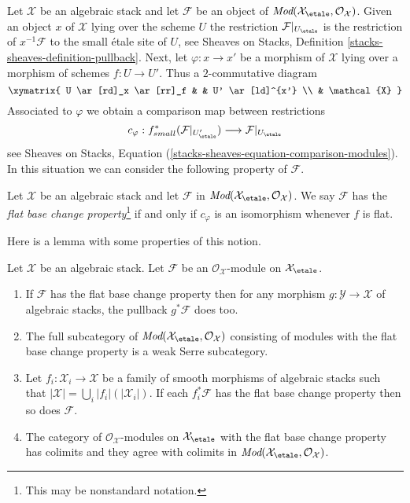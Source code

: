 \noindent
Let $\mathcal{X}$ be an algebraic stack and let $\mathcal{F}$ be an object
of $\textit{Mod}(\mathcal{X}_\etale, \mathcal{O}_\mathcal{X})$.
Given an object $x$ of $\mathcal{X}$ lying over the scheme $U$ the
restriction $\mathcal{F}|_{U_\etale}$ is the restriction of
$x^{-1}\mathcal{F}$ to the small \'etale site of $U$, see
Sheaves on Stacks, Definition \ref{stacks-sheaves-definition-pullback}.
Next, let $\varphi : x \to x'$ be a morphism of $\mathcal{X}$ lying
over a morphism of schemes $f : U \to U'$. Thus a $2$-commutative diagram
$$
\xymatrix{
U \ar[rd]_x \ar[rr]_f & & U' \ar[ld]^{x'} \\
& \mathcal{X}
}
$$
Associated to $\varphi$ we obtain a comparison map between restrictions
\begin{equation}
\label{equation-comparison-modules}
c_\varphi :
f_{small}^*(\mathcal{F}|_{U'_\etale})
\longrightarrow
\mathcal{F}|_{U_\etale}
\end{equation}
see Sheaves on Stacks, Equation
(\ref{stacks-sheaves-equation-comparison-modules}).
In this situation we can consider the following property
of $\mathcal{F}$.

\begin{definition}
\label{definition-flat-base-change}
Let $\mathcal{X}$ be an algebraic stack and let $\mathcal{F}$ in
$\textit{Mod}(\mathcal{X}_\etale, \mathcal{O}_\mathcal{X})$.
We say $\mathcal{F}$ has the {\it flat base change property}\footnote{This
may be nonstandard notation.}
if and only if $c_\varphi$ is an isomorphism whenever $f$ is flat.
\end{definition}

\noindent
Here is a lemma with some properties of this notion.

\begin{lemma}
\label{lemma-check-flat-comparison-on-etale-covering}
Let $\mathcal{X}$ be an algebraic stack. Let $\mathcal{F}$
be an $\mathcal{O}_\mathcal{X}$-module on $\mathcal{X}_\etale$.
\begin{enumerate}
\item If $\mathcal{F}$ has the flat base change property then for any morphism
$g : \mathcal{Y} \to \mathcal{X}$ of algebraic stacks, the
pullback $g^*\mathcal{F}$ does too.
\item The full subcategory of
$\textit{Mod}(\mathcal{X}_\etale, \mathcal{O}_\mathcal{X})$
consisting of modules with the flat base change property
is a weak Serre subcategory.
\item  Let $f_i : \mathcal{X}_i \to \mathcal{X}$ be a family of
smooth morphisms of algebraic stacks such that
$|\mathcal{X}| = \bigcup_i |f_i|(|\mathcal{X}_i|)$. If each
$f_i^*\mathcal{F}$ has the flat base change property then so does
$\mathcal{F}$.
\item The category of $\mathcal{O}_\mathcal{X}$-modules
on $\mathcal{X}_\etale$ with the flat base change property
has colimits and they agree with colimits in
$\textit{Mod}(\mathcal{X}_\etale, \mathcal{O}_\mathcal{X})$.
\end{enumerate}
\end{lemma}

